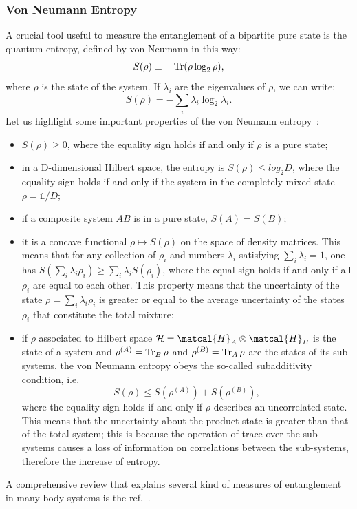 \subsubsection{Von Neumann Entropy}
A crucial tool useful to measure the entanglement of a bipartite pure state is the quantum entropy, defined by von Neumann in this way:
\begin{equation}
    S(\rho) \equiv -\operatorname{Tr} ( \rho \log_2\rho),
\end{equation}
where $\rho$ is the state of the system. If $\lambda_i$ are the eigenvalues of $\rho$, we can write:
\begin{equation*}
    S(\rho) = -\sum_i \lambda_i \log_2 \lambda_i.
\end{equation*}
Let us highlight some important properties of the von Neumann entropy~\cite{nielsen_chuang, pet_breuer:open_quantum}:
\begin{itemize}
    \item $S(\rho) \geq 0$, where the equality sign holds if and only if $\rho$ is a pure state;
    \item in a D-dimensional Hilbert space, the entropy is $S(\rho) \leq log_2 D$, where the equality sign holds if and only if the system in the completely mixed state $\rho = \mathds{1}/D$;
    \item if a composite system $AB$ is in a pure state, $S(A) = S(B)$;
    \item it is a concave functional $\rho \mapsto S(\rho)$ on the space of density matrices. This means that for any collection of $\rho_i$ and numbers $\lambda_i$ satisfying $\sum_i \lambda_i = 1$, one has $S(\sum_i \lambda_i \rho_i) \geq \sum_i \lambda_i S(\rho_i)$, where the equal sign holds if and only if all $\rho_i$ are equal to each other. This property means that the uncertainty of the state $\rho = \sum_i \lambda_i \rho_i$ is greater or equal to the average uncertainty of the states $\rho_i$ that constitute the total mixture;
    \item if $\rho$ associated to Hilbert space $ \mathcal{H} = \matcal{H}_A \otimes \matcal{H}_B$ is the state of a system and $\rho^{(A)} = \operatorname{Tr}_B \rho$ and $\rho^{(B)} = \operatorname{Tr}_A \rho$ are the states of its sub-systems, the von Neumann entropy obeys the so-called subadditivity condition, i.e.
    \begin{equation*}
        S(\rho) \leq S(\rho^{(A)}) + S(\rho^{(B)}),
    \end{equation*}
    where the equality sign holds if and only if $\rho$ describes an uncorrelated state. This means that the uncertainty about the product state is greater than that of the total system; this is because the operation of trace over the sub-systems causes a loss of information on correlations between the sub-systems, therefore the increase of entropy.
\end{itemize}

A comprehensive review that explains several kind of measures of entanglement in many-body systems is the ref.~\cite{RevModPhys.80.517}.